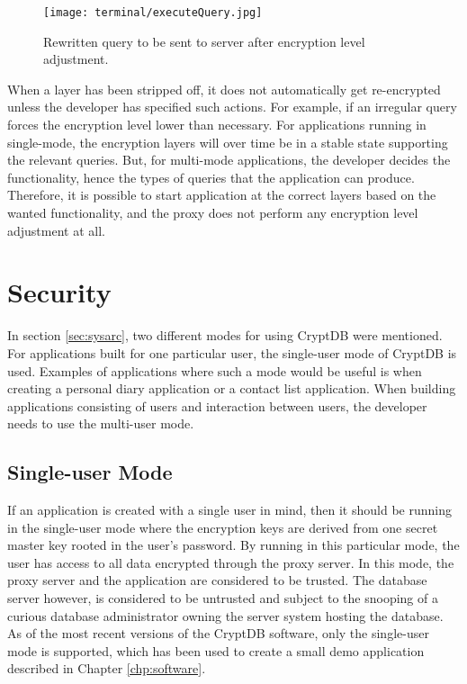 \begin{figure}[h]
	\texttt{[image: terminal/executeQuery.jpg]}
	\caption{Rewritten query to be sent to server after encryption level adjustment.}
	\label{rewritten_query}
\end{figure}

When a layer has been stripped off, it does not automatically get re-encrypted unless the developer has specified such actions. For example, if an irregular query forces the encryption level lower than necessary. For applications running in single-mode, the encryption layers will over time be in a stable state supporting the relevant queries. But, for multi-mode applications, the developer decides the functionality, hence the types of queries that the application can produce. Therefore, it is possible to start application at the correct layers based on the wanted functionality, and the proxy does not perform any encryption level adjustment at all.



\section{Security}

In section \ref{sec:sysarc}, two different modes for using CryptDB were mentioned. For applications built for one particular user, the single-user mode of CryptDB is used. Examples of applications where such a mode would be useful is when creating a personal diary application or a contact list application. When building applications consisting of users and interaction between users, the developer needs to use the multi-user mode.

\subsection{Single-user Mode}
If an application is created with a single user in mind, then it should be running in the single-user mode where the encryption keys are derived from one secret master key rooted in the user's password. By running in this particular mode, the user has access to all data encrypted through the proxy server. In this mode, the proxy server and the application are considered to be trusted. The database server however, is considered to be untrusted and subject to the snooping of a curious database administrator owning the server system hosting the database. As of the most recent versions of the CryptDB software, only the single-user mode is supported, which has been used to create a small demo application described in Chapter \ref{chp:software}.

